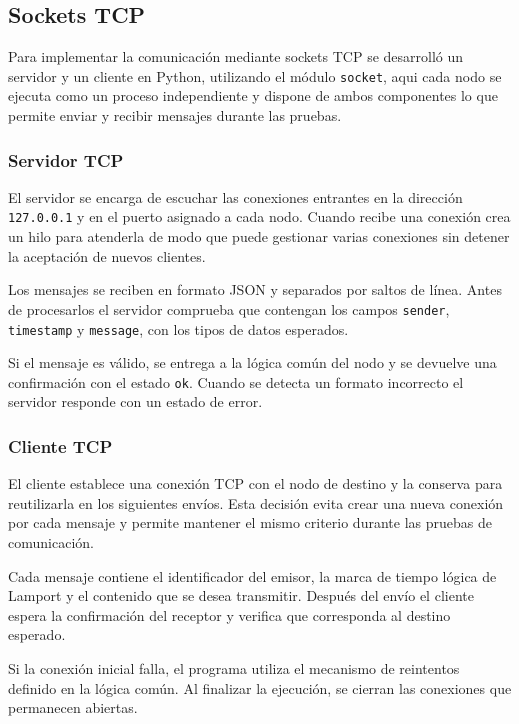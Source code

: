 \subsection{Sockets TCP}

Para implementar la comunicación mediante sockets TCP se
desarrolló un servidor y un cliente en Python, utilizando
el módulo \texttt{socket}, aqui cada nodo se ejecuta como un proceso
independiente y dispone de ambos componentes lo que permite
enviar y recibir mensajes durante las pruebas.

\subsubsection{Servidor TCP}

El servidor se encarga de escuchar las conexiones entrantes
en la dirección \texttt{127.0.0.1} y en el puerto asignado
a cada nodo. Cuando recibe una conexión crea un hilo para
atenderla de modo que puede gestionar varias conexiones
sin detener la aceptación de nuevos clientes.

Los mensajes se reciben en formato JSON y separados por
saltos de línea. Antes de procesarlos el servidor comprueba
que contengan los campos \texttt{sender}, \texttt{timestamp}
y \texttt{message}, con los tipos de datos esperados.

Si el mensaje es válido, se entrega a la lógica común
del nodo y se devuelve una confirmación con el estado
\texttt{ok}. Cuando se detecta un formato incorrecto
el servidor responde con un estado de error.

\subsubsection{Cliente TCP}

El cliente establece una conexión TCP con el nodo de destino
y la conserva para reutilizarla en los siguientes envíos.
Esta decisión evita crear una nueva conexión por cada mensaje
y permite mantener el mismo criterio durante las pruebas
de comunicación.

Cada mensaje contiene el identificador del emisor, la marca
de tiempo lógica de Lamport y el contenido que se desea
transmitir. Después del envío el cliente espera la
confirmación del receptor y verifica que corresponda
al destino esperado.

Si la conexión inicial falla, el programa utiliza el
mecanismo de reintentos definido en la lógica común.
Al finalizar la ejecución, se cierran las conexiones
que permanecen abiertas.

